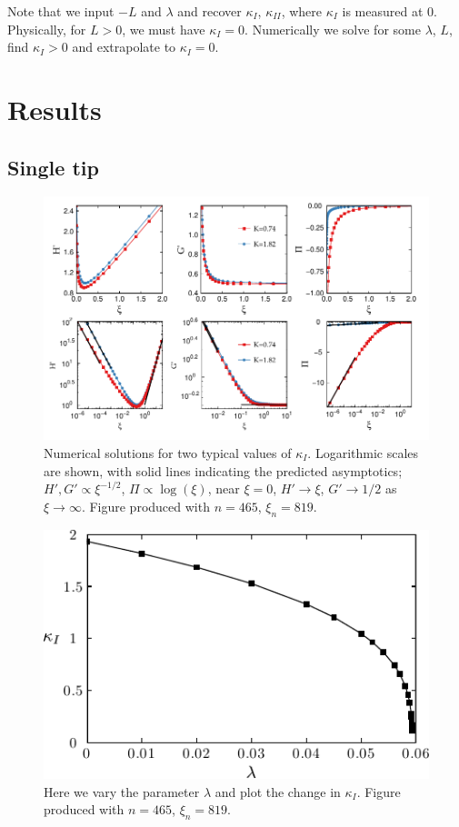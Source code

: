 \documentclass{jfm}
\begin{document}
Note that we input $-L$ and $\lambda$ and recover $\kappa_I$, $\kappa_{II}$, where 
$\kappa_I$ is measured at $0$. Physically, for $L>0$, we must have
$\kappa_I=0$. Numerically we solve for some $\lambda$, $L$, find $\kappa_I >0$ 
and extrapolate to $\kappa_I=0$.


%
%
% 
\clearpage
\section{Results}\label{sec:Results}
%
%
%
\subsection{Single tip}
\begin{figure}
  \centerline{\includegraphics{./../../Graphs/hprime-p-x-full.pdf}}
  \caption{Numerical solutions for two typical values of $\kappa_I$. 
           Logarithmic scales are shown, with solid lines indicating the 
           predicted asymptotics; $H', G' \propto \xi^{-1/2}$, 
           $\Pi \propto \log(\xi)$, near $\xi=0$, 
           $H' \to \xi$, $G'\to 1/2$ as $\xi \to \infty$. 
           Figure produced with $n=465$, $\xi_n=819$.}
\end{figure}
\begin{figure}
  \centerline{\includegraphics{./../../Graphs/K-lambda-edited.pdf}}
  \caption{Here we vary the parameter $\lambda$ and plot the change in 
           $\kappa_I$. Figure produced with $n=465$, $\xi_n = 819$.}
\end{figure}
\end{document}
